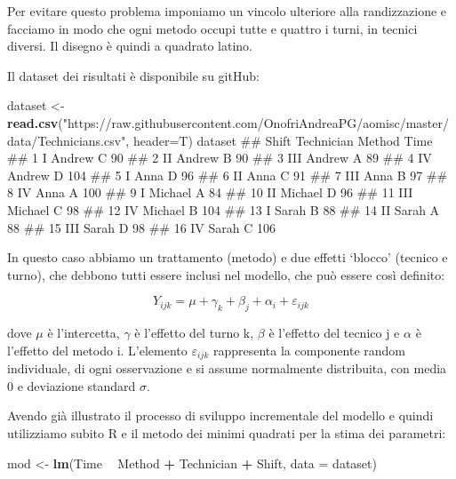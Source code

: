 \documentclass[a4paper,12pt,oneside]{book}
\newenvironment{Shaded}{\begin{snugshade}}{\end{snugshade}}
\newcommand{\KeywordTok}[1]{\textcolor[rgb]{0.13,0.29,0.53}{\textbf{#1}}}
\newcommand{\DataTypeTok}[1]{\textcolor[rgb]{0.13,0.29,0.53}{#1}}
\newcommand{\StringTok}[1]{\textcolor[rgb]{0.31,0.60,0.02}{#1}}
\newcommand{\OperatorTok}[1]{\textcolor[rgb]{0.81,0.36,0.00}{\textbf{#1}}}
\newcommand{\NormalTok}[1]{#1}
\theoremstyle{definition}
\theoremstyle{definition}
\theoremstyle{definition}
\theoremstyle{remark}
\begin{document}
Per evitare questo problema imponiamo un vincolo ulteriore alla
randizzazione e facciamo in modo che ogni metodo occupi tutte e quattro
i turni, in tecnici diversi. Il disegno è quindi a quadrato latino.

Il dataset dei risultati è disponibile su gitHub:

\begin{Shaded}
\begin{Highlighting}[]
\NormalTok{dataset <-}\StringTok{ }\KeywordTok{read.csv}\NormalTok{(}\StringTok{"https://raw.githubusercontent.com/OnofriAndreaPG/aomisc/master/data/Technicians.csv"}\NormalTok{, }\DataTypeTok{header=}\NormalTok{T)}
\NormalTok{dataset}
\NormalTok{##    Shift Technician Method Time}
\NormalTok{## 1      I     Andrew      C   90}
\NormalTok{## 2     II     Andrew      B   90}
\NormalTok{## 3    III     Andrew      A   89}
\NormalTok{## 4     IV     Andrew      D  104}
\NormalTok{## 5      I       Anna      D   96}
\NormalTok{## 6     II       Anna      C   91}
\NormalTok{## 7    III       Anna      B   97}
\NormalTok{## 8     IV       Anna      A  100}
\NormalTok{## 9      I    Michael      A   84}
\NormalTok{## 10    II    Michael      D   96}
\NormalTok{## 11   III    Michael      C   98}
\NormalTok{## 12    IV    Michael      B  104}
\NormalTok{## 13     I      Sarah      B   88}
\NormalTok{## 14    II      Sarah      A   88}
\NormalTok{## 15   III      Sarah      D   98}
\NormalTok{## 16    IV      Sarah      C  106}
\end{Highlighting}
\end{Shaded}

In questo caso abbiamo un trattamento (metodo) e due effetti `blocco'
(tecnico e turno), che debbono tutti essere inclusi nel modello, che può
essere così definito:

\[Y_{ijk} = \mu + \gamma_k + \beta_j + \alpha_i + \varepsilon_{ijk}\]

dove \(\mu\) è l'intercetta, \(\gamma\) è l'effetto del turno k,
\(\beta\) è l'effetto del tecnico j e \(\alpha\) è l'effetto del metodo
i. L'elemento \(\varepsilon_{ijk}\) rappresenta la componente random
individuale, di ogni osservazione e si assume normalmente distribuita,
con media 0 e deviazione standard \(\sigma\).

Avendo già illustrato il processo di sviluppo incrementale del modello e
quindi utilizziamo subito R e il metodo dei minimi quadrati per la stima
dei parametri:

\begin{Shaded}
\begin{Highlighting}[]
\NormalTok{mod <-}\StringTok{ }\KeywordTok{lm}\NormalTok{(Time }\OperatorTok{~}\StringTok{ }\NormalTok{Method }\OperatorTok{+}\StringTok{ }\NormalTok{Technician}
          \OperatorTok{+}\StringTok{ }\NormalTok{Shift, }\DataTypeTok{data =}\NormalTok{ dataset)}
\end{Highlighting}
\end{Shaded}
\end{document}
